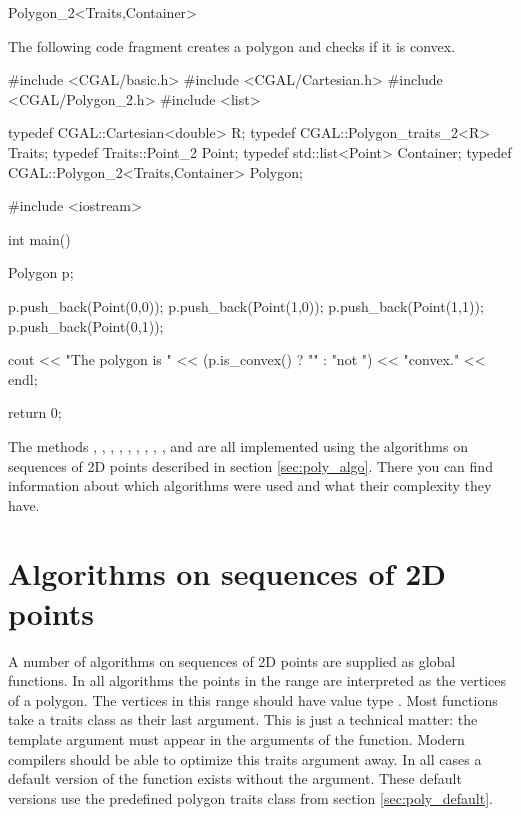 \begin{ccClassTemplate}{Polygon_2<Traits,Container>}
\ccExample

The following code fragment creates a polygon and checks if it is convex.

\begin{cprog}
#include <CGAL/basic.h>
#include <CGAL/Cartesian.h>
#include <CGAL/Polygon_2.h>
#include <list>

typedef CGAL::Cartesian<double> R;
typedef CGAL::Polygon_traits_2<R> Traits;
typedef Traits::Point_2 Point;
typedef std::list<Point> Container;
typedef CGAL::Polygon_2<Traits,Container> Polygon;

#include <iostream>

int main()
{
  Polygon p;

  p.push_back(Point(0,0));
  p.push_back(Point(1,0));
  p.push_back(Point(1,1));
  p.push_back(Point(0,1));

  cout << "The polygon is " << (p.is_convex() ? "" : "not ") << "convex." << endl;

  return 0;
}
\end{cprog}

The methods
,
,
,
,
,
,
,
,
,
 and
are all implemented using the algorithms on sequences of 2D points described
in section \ref{sec:poly_algo}. There you can find information about which
algorithms were used and what their complexity they have.

\end{ccClassTemplate}

\section{Algorithms on sequences of 2D points \label{sec:poly_algo}}

A number of algorithms on sequences of 2D points are supplied as global functions.
In all algorithms the points in the range \ccStyle{[first,last)} are interpreted
as the vertices of a polygon. The vertices in this range should have value type
. Most functions take a traits class as their last argument.
This is just a technical matter: the template argument  must
appear in the arguments of the function. Modern compilers should be able to
optimize this traits argument away. In all cases a default version of the function
exists without the  argument. These default versions use the predefined
polygon traits class from section \ref{sec:poly_default}.

